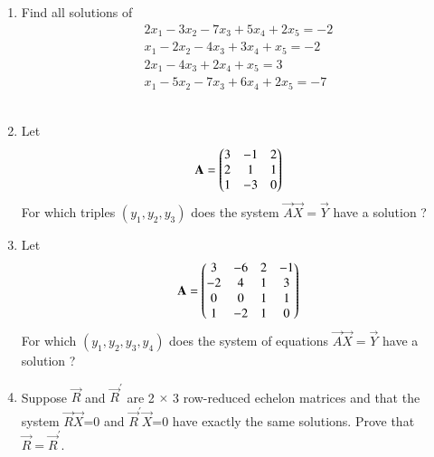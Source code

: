 \begin{enumerate}[label=\thesubsection.\arabic*.,ref=\thesubsection.\theenumi]
%
\item Find all solutions of
 \begin{align}
 2x_1-3x_2-7x_3+5x_4+2x_5=-2\\x_1-2x_2-4x_3+3x_4+x_5=-2\\2x_1-4x_3+2x_4+x_5=3\\x_1-5x_2-7x_3+6x_4+2x_5=-7
 \end{align}
%
\\
\solution

\item Let
\begin{align}
    \mathbf{A}=\begin{pmatrix}3 & -1 & 2\\2 & 1 & 1\\1 & -3 & 0\end{pmatrix} 
\end{align}
For which triples $(y_1,y_2,y_3)$ does the system $\vec{A}\vec{X}=\vec{Y}$ have a solution ? 
\\
\solution

\item Let
\begin{align}
    \mathbf{A}=\begin{pmatrix}3 & -6 & 2 & -1\\-2 & 4 & 1 & 3\\0 & 0 & 1& 1\\1 & -2 & 1 & 0\end{pmatrix} 
\end{align}
For which $(y_1,y_2,y_3,y_4)$ does the system of equations $\vec{A}\vec{X}=\vec{Y}$ have a solution ? 
%
\solution

%
%
\item Suppose $\vec{R}$ and $\vec{R}^{'}$ are 2 $\times$ 3 row-reduced echelon matrices and that the system $\vec{R}$$\vec{X}$=0 and $\vec{R}^{'}\vec{X}$=0 have exactly the same solutions. Prove 
that $\vec{R}=\vec{R}^{'}$.

\solution

\end{enumerate}


